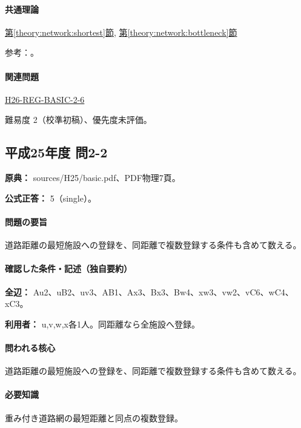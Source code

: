 \paragraph{共通理論} \hyperref[theory:network:shortest]{第\ref*{theory:network:shortest}節}, \hyperref[theory:network:bottleneck]{第\ref*{theory:network:bottleneck}節}

\par 参考：\cite{net_dijkstra}。

\paragraph{関連問題} \hyperref[q:h26-reg-basic-2-6]{H26-REG-BASIC-2-6}

\par 難易度 2（校準初稿）、優先度未評価。

\subsection{平成25年度 問2-2}
\label{q:h25-reg-basic-2-2}

\noindent\textbf{原典：} sources/H25/basic.pdf、PDF物理7頁。

\textbf{公式正答：} 5（single）。

\paragraph{問題の要旨} 道路距離の最短施設への登録を、同距離で複数登録する条件も含めて数える。

\paragraph{確認した条件・記述（独自要約）}\mbox{}\par

\noindent\textbf{全辺：} Au2、uB2、uv3、AB1、Ax3、Bx3、Bw4、xw3、vw2、vC6、wC4、xC3。\par

\noindent\textbf{利用者：} u,v,w,x各1人。同距離なら全施設へ登録。\par

\paragraph{問われる核心} 道路距離の最短施設への登録を、同距離で複数登録する条件も含めて数える。

\paragraph{必要知識} 重み付き道路網の最短距離と同点の複数登録。

